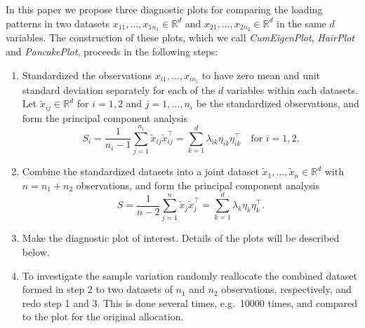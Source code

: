 \documentclass[titlepage,11pt,twoside]{article}
\newcommand{\RR}{\mathbb{R}}
\begin{document}

In this paper we propose three diagnostic plots for comparing the loading patterns in two datasets $x_{11},\dotsc,x_{1 n_1} \in \RR^d$ and $x_{21},\dotsc,x_{2 n_2} \in \RR^d$ in the same $d$ variables. The construction of these plots, which we call \emph{CumEigenPlot}, \emph{HairPlot} and \emph{PancakePlot}, proceeds in the following steps:
\begin{enumerate}
\item Standardized the observations $x_{i1},\dotsc,x_{i n_i}$ to have zero mean and unit standard deviation separately for each of the $d$ variables within each datasets. Let $\tilde{x}_{ij} \in \RR^d$ for $i=1,2$ and $j=1,\dotsc,n_i$ be the standardized observations, and form the principal component analysis
\begin{equation*}
S_i = \frac{1}{n_i-1} \sum_{j=1}^{n_i} \tilde{x}_{ij} \tilde{x}_{ij}^\top = \sum_{k=1}^d \lambda_{ik} \eta_{ik} \eta_{ik}^\top \quad \text{for $i=1,2$.} 
\end{equation*}
\item Combine the standardized datasets into a joint dataset $\tilde{x}_1,\dotsc,\tilde{x}_n \in \RR^d$ with $n=n_1+n_2$ observations, and form the principal component analysis
\begin{equation*}
S = \frac{1}{n-2} \sum_{j=1}^n \tilde{x}_j \tilde{x}_j^\top = \sum_{k=1}^d \lambda_k \eta_k \eta_k^\top.
\end{equation*}
\item Make the diagnostic plot of interest. Details of the plots will be described below.
\item To investigate the sample variation randomly reallocate the combined dataset formed in step 2 to two datasets of $n_1$ and $n_2$ observations, respectively, and redo step 1 and 3. This is done several times, e.g.\ 10000 times, and compared to the plot for the original allocation.
\end{enumerate} 
\end{document}
